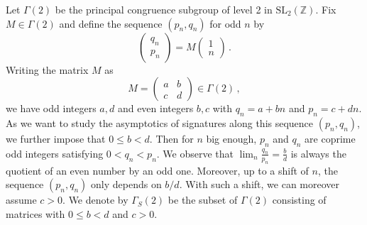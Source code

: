 \documentclass{amsart}
\newcommand{\Z}{\mathbb{Z}}
\newcommand{\SL}{\mathrm{SL}}
\theoremstyle{definition}
\begin{document}
Let $\Gamma(2)$ be the principal congruence subgroup of level 2 in $\SL_2(\Z)$. Fix $M \in \Gamma(2)$ and define the sequence $(p_n,q_n)$ for odd $n$ by
\begin{equation}
\label{eqn.pnqn}
\begin{pmatrix}
    q_n\\
    p_n 
\end{pmatrix} = M 
\begin{pmatrix}
    1\\
    n
\end{pmatrix}  \,.
\end{equation}
Writing the matrix $M$ as
\begin{equation*}
    M=\begin{pmatrix} a & b \\ c & d \end{pmatrix}\in\Gamma(2) \,,
\end{equation*}
we have odd integers $a,d$ and even integers $b,c$ with $q_n = a+bn$ and $p_n = c+dn$.
As we want to study the asymptotics of signatures along this sequence $(p_n,q_n)$, we further impose that  $0\le b<d$. Then for $n$ big enough, $p_n$ and $q_n$ are coprime odd integers satisfying $0<q_n<p_n$.
We observe that $\lim_n\frac{q_n}{p_n}=\frac{b}{d}$ is always the quotient of an even number by an odd one. Moreover, up to a shift of $n$, the sequence $(p_n,q_n)$ only depends on $b/d$. With such a shift, we can moreover assume $c>0$. We denote by $\Gamma_S(2)$ be the subset of $\Gamma(2)$ consisting of matrices with $0 \leq b <d$ and $c>0$.
\end{document}
